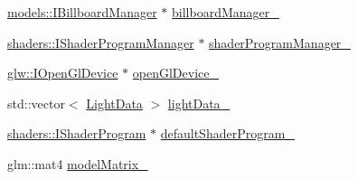 \begin{DoxyCompactItemize}
\item 
\hyperlink{classglr_1_1models_1_1IBillboardManager}{models\-::\-I\-Billboard\-Manager} $\ast$ \hyperlink{classglr_1_1BasicSceneManager_a9c26318121dce7e8226757afc891b125}{billboard\-Manager\-\_\-}
\item 
\hyperlink{classglr_1_1shaders_1_1IShaderProgramManager}{shaders\-::\-I\-Shader\-Program\-Manager} $\ast$ \hyperlink{classglr_1_1BasicSceneManager_a51c4d7f333e5db431e798dba4e63a5b7}{shader\-Program\-Manager\-\_\-}
\item 
\hyperlink{classglr_1_1glw_1_1IOpenGlDevice}{glw\-::\-I\-Open\-Gl\-Device} $\ast$ \hyperlink{classglr_1_1BasicSceneManager_a29bbc04df967224815d4c126d7a7bc9c}{open\-Gl\-Device\-\_\-}
\item 
std\-::vector$<$ \hyperlink{structglr_1_1LightData}{Light\-Data} $>$ \hyperlink{classglr_1_1BasicSceneManager_a72fc8c2b7b4b65a4144a81240db29648}{light\-Data\-\_\-}
\item 
\hyperlink{classglr_1_1shaders_1_1IShaderProgram}{shaders\-::\-I\-Shader\-Program} $\ast$ \hyperlink{classglr_1_1BasicSceneManager_a29d41264ff0c26705b9900b3dc38f4e9}{default\-Shader\-Program\-\_\-}
\item 
glm\-::mat4 \hyperlink{classglr_1_1BasicSceneManager_a45f358540f118ce1c5244f9927ccdfbd}{model\-Matrix\-\_\-}
\end{DoxyCompactItemize}


